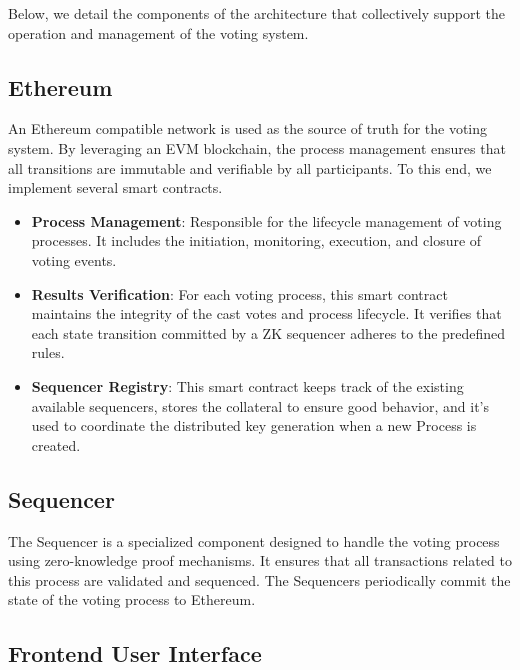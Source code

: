 
Below, we detail the components of the architecture that collectively support the operation and management of the voting system.

\begin{figure}[h]
	\centering
\end{figure}

\subsection{Ethereum}

An Ethereum compatible network is used as the source of truth for the voting system. By leveraging an EVM blockchain, the process management ensures that all transitions are immutable and verifiable by all participants. To this end, we implement several smart contracts.

\begin{itemize}
	\item \textbf{Process Management}: Responsible for the lifecycle management of voting processes. It includes the initiation, monitoring, execution, and closure of voting events.
	
	\item \textbf{Results Verification}: For each voting process, this smart contract maintains the integrity of the cast votes and process lifecycle. It verifies that each state transition committed by a ZK sequencer adheres to the predefined rules.
	
	\item \textbf{Sequencer Registry}: This smart contract keeps track of the existing available sequencers, stores the collateral to ensure good behavior, and it's used to coordinate the distributed key generation when a new Process is created.
\end{itemize}

\subsection{Sequencer}

The Sequencer is a specialized component designed to handle the voting process using zero-knowledge proof mechanisms. It ensures that all transactions related to this process are validated and sequenced. The Sequencers periodically commit the state of the voting process to Ethereum.

\subsection{Frontend User Interface}

